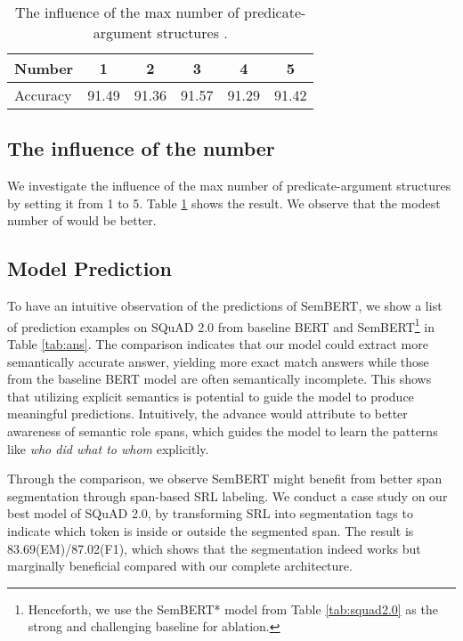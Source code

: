 \documentclass[letterpaper]{article} \usepackage{aaai20}  \usepackage{times}  \usepackage{helvet} \usepackage{courier}  \usepackage[hyphens]{url}  \usepackage{graphicx} \urlstyle{rm} \def\UrlFont{\rm}  \usepackage{graphicx}  \frenchspacing  \usepackage{amssymb}
\begin{document}
\begin{table} 
	\centering
		\resizebox{\linewidth}{!}
	{
	\begin{tabular}{l c c c c c}
		\hline
		
		\hline
		Number & 1 & 2 & 3 & 4 & 5   \\ 
		\hline
		Accuracy & 91.49 & 91.36 & 91.57 & 91.29 & 91.42 \\
		\hline
		
		\hline
	\end{tabular}
}
	{
		\caption{\label{fig:m} The influence of the max number of predicate-argument structures .}
	}
\end{table}

\subsection{The influence of the number }
We investigate the influence of the max number of predicate-argument structures  by setting it from 1 to 5. Table \ref{fig:m} shows the result. We observe that the modest number of  would be better. 


\subsection{Model Prediction}\label{span_out}
To have an intuitive observation of the predictions of SemBERT, we show a list of prediction examples on SQuAD 2.0 from baseline BERT and SemBERT\footnote[11]{Henceforth, we use the SemBERT* model from Table \ref{tab:squad2.0} as the strong and challenging baseline for ablation.} in Table \ref{tab:ans}. The comparison indicates that our model could extract more semantically accurate answer, yielding more exact match answers while those from the baseline BERT model are often semantically incomplete. This shows that utilizing explicit semantics is potential to guide the model to produce meaningful predictions. 
Intuitively, the advance would attribute to better awareness of semantic role spans, which guides the model to learn the patterns like \emph{who did what to whom} explicitly. 

Through the comparison, we observe SemBERT might benefit from better span segmentation through span-based SRL labeling. We conduct a case study on our best model of SQuAD 2.0, by transforming SRL into segmentation tags to indicate which token is inside or outside the segmented span. The result is 83.69(EM)/87.02(F1), which shows that the segmentation indeed works but marginally beneficial compared with our complete architecture.
\end{document}
